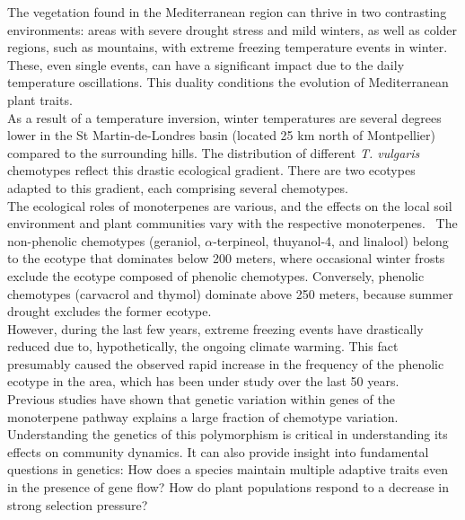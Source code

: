 The vegetation found in the Mediterranean region can thrive in two contrasting environments: areas with severe drought stress and mild winters, as well as colder regions, such as mountains, with extreme freezing temperature events in winter. These, even single events, can have a significant impact due to the daily temperature oscillations. This duality conditions the evolution of Mediterranean plant traits.~\cite{thompsonPlantTraitsEcological2020}\\

As a result of a temperature inversion, winter temperatures are several degrees lower in the St Martin-de-Londres basin (located 25 km north of Montpellier) compared to the surrounding hills. The distribution of different \textit{T. vulgaris} chemotypes reflect this drastic ecological gradient. There are two ecotypes adapted to this gradient, each comprising several chemotypes. ~\cite{thompsonPlantTraitsEcological2020,bataillonGenotypePhenotypeGenetic2022} \\

The ecological roles of monoterpenes are various, and the effects on the local soil environment and plant communities vary with the respective monoterpenes.~\cite{bataillonGenotypePhenotypeGenetic2022} The non-phenolic chemotypes (geraniol, $\alpha$-terpineol, thuyanol-4, and linalool) belong to the ecotype that dominates below 200 meters, where occasional winter frosts exclude the ecotype composed of phenolic chemotypes. Conversely, phenolic chemotypes (carvacrol and thymol) dominate above 250 meters, because summer drought excludes the former ecotype.~\cite{thompsonPlantTraitsEcological2020}\\

However, during the last few years, extreme freezing events have drastically reduced due to, hypothetically, the ongoing climate warming. This fact presumably caused the observed rapid increase in the frequency of the phenolic ecotype in the area, which has been under study over the last 50 years.~\cite{thompsonPlantTraitsEcological2020,bataillonGenotypePhenotypeGenetic2022} \\

Previous studies have shown that genetic variation within genes of the monoterpene pathway explains a large fraction of chemotype variation. ~\cite{bataillonGenotypePhenotypeGenetic2022} Understanding the genetics of this polymorphism is critical in understanding its effects on community dynamics. It can also provide insight into fundamental questions in genetics: How does a species maintain multiple adaptive traits even in the presence of gene flow? How do plant populations respond to a decrease in strong selection pressure?~\cite{bataillonGenotypePhenotypeGenetic2022, thompsonPlantTraitsEcological2020}\\

